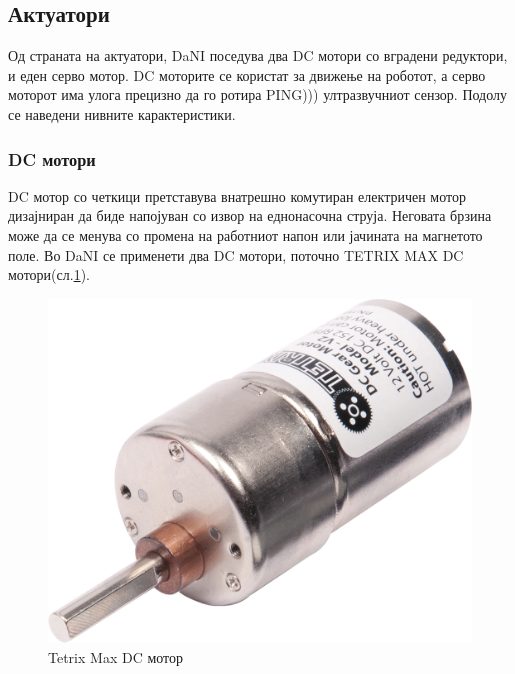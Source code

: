 \documentclass[12pt]{article}
\begin{document}
	\subsection{Актуатори}
		Од страната на актуатори, DaNI поседува два DC мотори со вградени редуктори, и еден серво мотор. DC моторите се користат за движење на роботот, а серво моторот има улога прецизно да го ротира PING))) ултразвучниот сензор. Подолу се наведени нивните карактеристики.

	  \subsubsection{DC мотори}
		  DC мотор со четкици претставува внатрешно комутиран електричен мотор дизајниран да биде напојуван со извор на еднонасочна струја. Неговата брзина може да се менува со промена на работниот напон или јачината на магнетото поле.
		  Во DaNI се применети два DC мотори, поточно TETRIX MAX DC мотори(сл.\ref{fig:dc_motor_iso.png}).

		  \begin{figure}[H]
    	  \includegraphics[width=0.35\linewidth]{./images/dc_motor_iso.png}
			  \centering
			  \caption{Tetrix Max DC мотор}
			  \label{fig:dc_motor_iso.png}
			  \end{figure}
\end{document}
